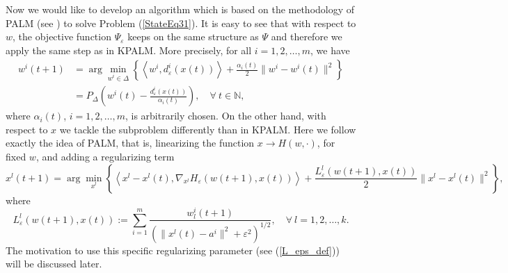 \documentclass[12pt]{article}
\numberwithin{equation}{section}
\begin{document}
Now we would like to develop an algorithm which is based on the methodology of PALM (see ) to solve Problem (\ref{StateEq31}). It is easy to see that with respect to $w$, the objective function $\Psi_{\varepsilon}$ keeps on the same structure as $\Psi$ and therefore we apply the same step as in KPALM. More precisely, for all $i=1,2, \ldots, m$, we have
\begin{align*}
	w^i(t+1) &= \arg\!\min\limits_{w^i \in \Delta} \left\lbrace \left\langle w^i, d^i_{\varepsilon}(x(t)) \right\rangle + \frac{\alpha_i(t)}{2} \|w^i -w^i(t)\|^2 \right\rbrace \\
	&= P_{\Delta} \left( w^i(t) - \frac{d^i_{\varepsilon}(x(t))}{\alpha_i(t)} \right), \quad \forall \: t \in \mathbb{N},
\end{align*}
where $\alpha_i(t)$, $i=1,2, \ldots, m$, is arbitrarily chosen. On the other hand, with respect to $x$ we tackle the subproblem differently than in KPALM. Here we follow exactly the idea of PALM, that is, linearizing the function $x \rightarrow H(w,\cdot)$, for fixed $w$, and adding a regularizing term
\begin{equation*}
	x^l(t+1) = \arg\!\min\limits_{x^l} \left\lbrace \left\langle x^l - x^l(t) , \nabla_{x^l}H_{\varepsilon}(w(t+1),x(t)) \right\rangle + \frac{L^l_{\varepsilon}(w(t+1),x(t))}{2} \|x^l - x^l(t)\|^2 \right\rbrace,
\end{equation*}
where 
\begin{equation}
	L^l_{\varepsilon}(w(t+1),x(t)) := \sum\limits_{i=1}^{m} \frac{w^i_l(t+1)}{\left( \|x^l(t)-a^i\|^2 + {\varepsilon}^2 \right)^{1/2}}, \quad \forall \: l=1,2, \ldots, k. \label{L_eps_def}
\end{equation}
The motivation to use this specific regularizing parameter (see (\ref{L_eps_def})) will be discussed later.
\end{document}
